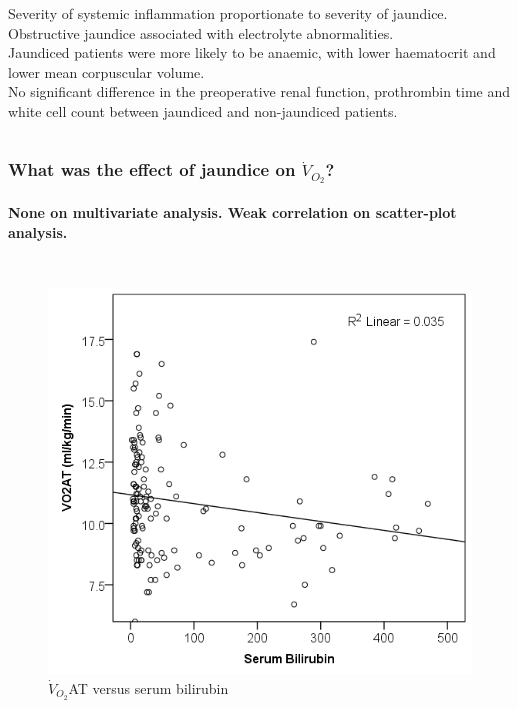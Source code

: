 \documentclass[10pt]{beamer}
\begin{document}
\begin{frame}
\begin{columns}
		{\scriptsize			
			Severity of systemic inflammation proportionate to severity of jaundice. \\
			\medskip
			Obstructive jaundice associated with electrolyte abnormalities.\\
			\medskip
			Jaundiced patients were more likely to be anaemic, with lower haematocrit and lower mean corpuscular volume.\\
			\medskip
			No significant difference in the preoperative renal function, prothrombin time and white cell count between jaundiced and non-jaundiced patients.\\
		}
	\end{columns}
\end{frame}


\begin{frame}
	\frametitle{What was the effect of jaundice on $\dot{V}_{O_2}$?}
	\framesubtitle{None on multivariate analysis. Weak correlation on scatter-plot analysis.}
	\begin{columns}[t]
		\begin{figure}
			\includegraphics[width=\textwidth]{../Figures/cpet_oj_scatter_at_bil}
			\\ $\dot{V}_{O_2}$AT versus serum bilirubin
		\end{figure}
		

\end{columns}
\end{frame}
\end{document}
